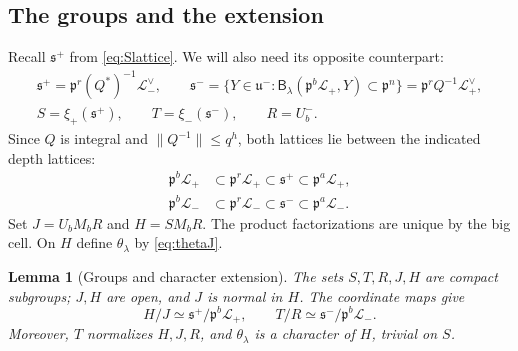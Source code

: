 \documentclass[11pt,reqno]{amsart}
\numberwithin{equation}{section}
\theoremstyle{plain}
\newtheorem{lemma}[theorem]{Lemma}
\theoremstyle{definition}
\theoremstyle{remark}
\theoremstyle{plain}
\newcommand{\pp}{\mathfrak{p}}   %
\newcommand{\Lat}{\mathcal{L}}   %
\newcommand{\g}{\mathfrak{g}}    %
\newcommand{\uu}{\mathfrak{u}}   %
\newcommand{\sS}{\mathfrak{s}^+}   %
\newcommand{\sT}{\mathfrak{s}^-}   %
\newcommand{\norm}[1]{\lVert#1\rVert}
\newcommand{\lf}{\lambda}
\newcommand{\Bf}{\mathsf{B}}
\begin{document}
\subsection{The groups and the extension}\label{sec:groupdetails}
Recall $\sS$ from \eqref{eq:Slattice}. We will also need its
opposite counterpart:
\begin{equation}\label{eq:ST}
\begin{gathered}
\sS=\pp^r(Q^*)^{-1}\Lat_-^\vee,\qquad
\sT=\{Y\in\uu^-:\Bf_\lf(\pp^b\Lat_+,Y)
\subset\pp^n\}=\pp^rQ^{-1}\Lat_+^\vee,\\
S=\xi_+(\sS),\qquad T=\xi_-(\sT),\qquad R=U^-_b.
\end{gathered}
\end{equation}
Since $Q$ is integral and $\norm{Q^{-1}}\le q^h$, both lattices
lie between the indicated depth lattices:
\[
\begin{aligned}
\pp^b\Lat_+&\subset\pp^r\Lat_+\subset\sS\subset\pp^a\Lat_+,\\
\pp^b\Lat_-&\subset\pp^r\Lat_-\subset\sT\subset\pp^a\Lat_-.
\end{aligned}
\]
Set $J=U_bM_bR$ and $H=SM_bR$. The product factorizations are unique
by the big cell. On $H$ define $\theta_\lf$ by \eqref{eq:thetaJ}.

\begin{lemma}[Groups and character extension]\label{lem:groups}
The sets $S,T,R,J,H$ are compact subgroups; $J,H$ are open, and
$J$ is normal in $H$. The coordinate maps give
\[
H/J\simeq\sS/\pp^b\Lat_+,\qquad
T/R\simeq\sT/\pp^b\Lat_-.
\]
Moreover, $T$ normalizes $H,J,R$, and $\theta_\lf$ is a character
of $H$, trivial on $S$.
\end{lemma}
\end{document}
